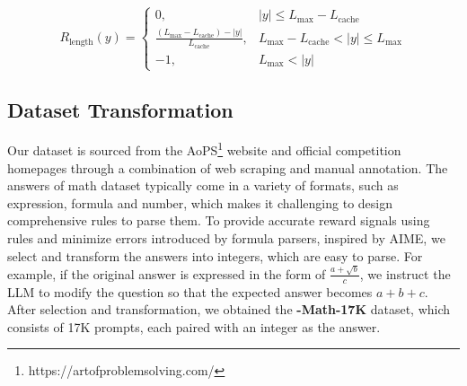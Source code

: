 \begin{equation}
R_{\text{length}}(y) =
\begin{cases}
0, & |y| \le L_{\text{max}} - L_{\text{cache}} \\
\frac{(L_{\text{max}} - L_{\text{cache}}) - |y|}{L_{\text{cache}}}, & L_{\text{max}} - L_{\text{cache}}<|y|\le L_{\text{max}} \\
-1, & L_{\text{max}} < |y|
\end{cases}
\label{eq:soft_punish}
\end{equation}




\subsection{Dataset Transformation}
\label{sec:dataprocess}

Our dataset is sourced from the AoPS\footnote{https://artofproblemsolving.com/} website and official competition homepages through a combination of web scraping and manual annotation.
The answers of math dataset typically come in a variety of formats, such as expression, formula and number, which makes it challenging to design comprehensive rules to parse them.
To provide accurate reward signals using rules and minimize errors introduced by formula parsers, inspired by AIME, we select and transform the answers into integers, which are easy to parse.
For example, if the original answer is expressed in the form of \( \frac{a + \sqrt{b}}{c} \), we instruct the LLM to modify the question so that the expected answer becomes \( a + b + c \).
After selection and transformation, we obtained the \textbf{\method-Math-17K} dataset, which consists of 17K prompts, each paired with an integer as the answer.



